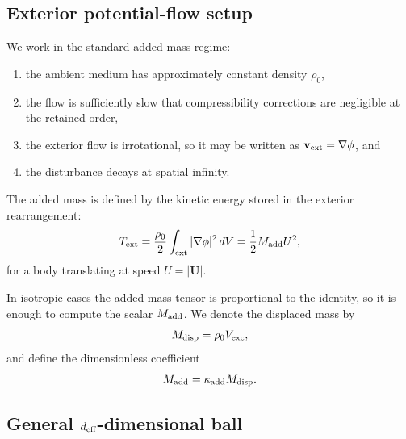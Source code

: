 \documentclass[11pt]{article}
\newcommand{\kadd}{\kappa_{\mathrm{add}}}
\begin{document}
\subsection{Exterior potential-flow setup}
\label{app:added-mass-setup}

We work in the standard added-mass regime:
\begin{enumerate}[leftmargin=1.5em]
  \item the ambient medium has approximately constant density \(\rho_0\),
  \item the flow is sufficiently slow that compressibility corrections are negligible at
  the retained order,
  \item the exterior flow is irrotational, so it may be written as
  \(\mathbf v_{\rm ext}=\nabla \phi\), and
  \item the disturbance decays at spatial infinity.
\end{enumerate}
The added mass is defined by the kinetic energy stored in the exterior rearrangement:
\begin{equation}
T_{\rm ext}
=
\frac{\rho_0}{2}\int_{\rm ext} |\nabla \phi|^2\,dV
=
\frac12 M_{\rm add} U^2,
\label{eq:app-added-mass-def}
\end{equation}
for a body translating at speed \(U=|\mathbf U|\).

In isotropic cases the added-mass tensor is proportional to the identity, so it is enough
to compute the scalar \(M_{\rm add}\). We denote the displaced mass by
\begin{equation}
M_{\rm disp}=\rho_0 V_{\rm exc},
\label{eq:app-displaced-mass}
\end{equation}
and define the dimensionless coefficient
\begin{equation}
M_{\rm add}=\kadd M_{\rm disp}.
\label{eq:app-kadd-def}
\end{equation}

\subsection{General \(d_{\rm eff}\)-dimensional ball}
\label{app:added-mass-general-d}
\end{document}
